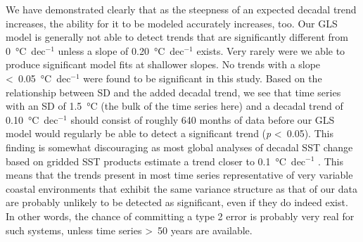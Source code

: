 \documentclass[twocol]{ametsoc}
\begin{document}
We have demonstrated clearly that as the steepness of an expected decadal trend increases, the ability for it to be modeled accurately increases, too. Our GLS model is generally not able to detect trends that are significantly different from \SI{0}{\degreeCelsius}~dec$^{-1}$ unless a slope of \SI{0.20}{\degreeCelsius}~dec$^{-1}$ exists. Very rarely were we able to produce significant model fits at shallower slopes. No trends with a slope \textless~\SI{0.05}{\degreeCelsius}~dec$^{-1}$ were found to be significant in this study. Based on the relationship between SD and the added decadal trend, we see that time series with an SD of \SI{1.5}{\degreeCelsius} (the bulk of the time series here) and a decadal trend of \SI{0.10}{\degreeCelsius}~dec$^{-1}$ should consist of roughly 640 months of data before our GLS model would regularly be able to detect a significant trend (\emph{p} \textless~0.05). This finding is somewhat discouraging as most global analyses of decadal SST change based on gridded SST products estimate a trend closer to \SI{0.1}{\degreeCelsius}~dec$^{-1}$ \citep[\emph{e.g.}][]{IPCC2013}. This means that the trends present in most time series representative of very variable coastal environments that exhibit the same variance structure as that of our data are probably unlikely to be detected as significant, even if they do indeed exist. In other words, the chance of committing a type 2 error is probably very real for such systems, unless time series \textgreater~50 years are available.
\end{document}
